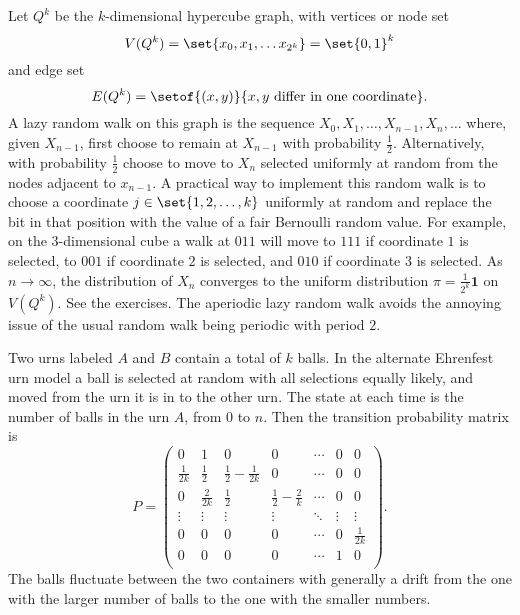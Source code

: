 \documentclass[12pt]{article}
\begin{document}
\begin{example}
    Let \( Q^k \) be the \( k \)-dimensional hypercube graph, with
    vertices or node set
    \[
        V(Q^k) = \set{x_0, x_1, \dots x_{2^k}} = \set{0,1}^k
    \] and edge set
    \[
        E(Q^k) = \setof{(x,y)}{x, y \text{ differ in one coordinate}}.
    \]%
    A lazy random walk on this graph is the sequence \( X_0, X_1, \dots,
    X_{n-1}, X_n, \dots \) where, given \( X_{n-1} \), first choose to
    remain at \( X_{n-1} \) with probability \( \frac{1}{2} \).
    Alternatively, with probability \( \frac{1}{2} \) choose to move to \(
    X_n \) selected uniformly at random from the nodes adjacent to \( x_
    {n-1} \).  A practical way to implement this random walk is to
    choose a coordinate \( j \in \set{1,2, \dots, k} \) uniformly at
    random and replace the bit in that position with the value of a fair
    Bernoulli random value.%
    For example, on the \( 3 \)-dimensional cube a walk at \( 011 \)
    will move to \( 111 \) if coordinate \( 1 \) is selected, to \( 001 \)
    if coordinate \( 2 \) is selected, and \( 010 \) if coordinate \( 3 \)
    is selected.  As \( n \to \infty \), the distribution of \( X_n \)
    converges to the uniform distribution \( \pi = \frac{1}{2^k}\mathbf{1}
    \) on \( V(Q^k) \).  See the exercises.  The aperiodic lazy random
    walk avoids the annoying issue of the usual random walk being
    periodic with period \( 2 \).

    Two urns labeled \( A \) and \( B \) contain a total of \( k \)
    balls.  In the alternate Ehrenfest urn model a%
    ball is selected at random with all selections equally likely, and
    moved from the urn it is in to the other urn.  The state at each
    time is the number of balls in the urn \( A \), from \( 0 \) to \( n
    \).  Then the transition probability matrix is
    \[
        P =
        \begin{pmatrix}
            0 & 1 & 0 & 0 & \cdots & 0 & 0 \\
            \frac{1}{2k} & \frac{1}{2} & \frac{1}{2}-\frac{1}{2k} & 0 &
            \cdots & 0 & 0 \\
            0 & \frac{2}{2k} & \frac{1}{2} & \frac{1}{2}-\frac{2}{k} &
            \cdots & 0 & 0 \\
            \vdots & \vdots & \vdots & \vdots & \ddots& \vdots & \vdots
            \\
            0 & 0 & 0 & 0 & \cdots & 0 & \frac{1}{2k} \\
            0 & 0 & 0 & 0 & \cdots & 1 & 0 \\
        \end{pmatrix}
        .
    \] The balls fluctuate between the two containers with generally a
    drift from the one with the larger number of balls to the one with
    the smaller numbers.


\end{example}
\end{document}

